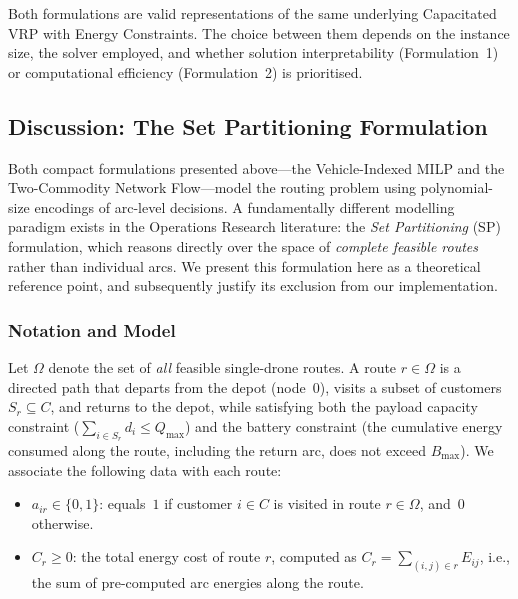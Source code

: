 \documentclass[11pt,a4paper]{article}
\begin{document}
Both formulations are valid representations of the same underlying Capacitated VRP with Energy Constraints. The choice between them depends on the instance size, the solver employed, and whether solution interpretability (Formulation~1) or computational efficiency (Formulation~2) is prioritised.

\subsection{Discussion: The Set Partitioning Formulation}

Both compact formulations presented above---the Vehicle-Indexed MILP and the Two-Commodity Network Flow---model the routing problem using polynomial-size encodings of arc-level decisions. A fundamentally different modelling paradigm exists in the Operations Research literature: the \emph{Set Partitioning} (SP) formulation, which reasons directly over the space of \emph{complete feasible routes} rather than individual arcs. We present this formulation here as a theoretical reference point, and subsequently justify its exclusion from our implementation.

\subsubsection{Notation and Model}

Let $\Omega$ denote the set of \emph{all} feasible single-drone routes. A route $r \in \Omega$ is a directed path that departs from the depot (node~$0$), visits a subset of customers $S_r \subseteq C$, and returns to the depot, while satisfying both the payload capacity constraint ($\sum_{i \in S_r} d_i \le Q_{\max}$) and the battery constraint (the cumulative energy consumed along the route, including the return arc, does not exceed $B_{\max}$). We associate the following data with each route:

\begin{itemize}
  \item $a_{ir} \in \{0, 1\}$: equals~$1$ if customer $i \in C$ is visited in route $r \in \Omega$, and~$0$ otherwise.
  \item $C_r \ge 0$: the total energy cost of route $r$, computed as $C_r = \sum_{(i,j) \in r} E_{ij}$, i.e., the sum of pre-computed arc energies along the route.
\end{itemize}
\end{document}
